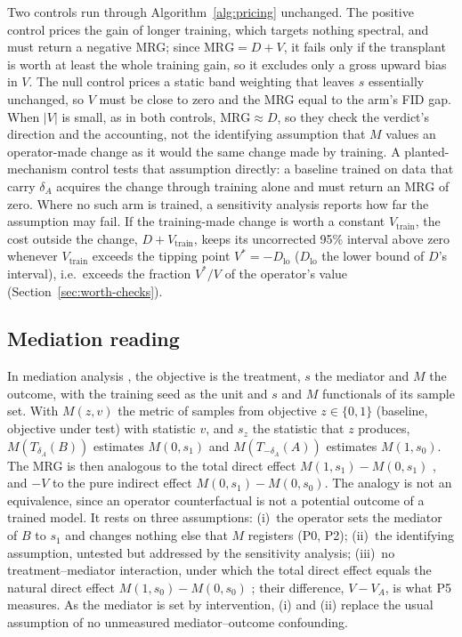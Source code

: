 Two controls run through Algorithm~\ref{alg:pricing} unchanged. The positive
control prices the gain of longer training, which targets nothing spectral,
and must return a negative MRG; since $\mathrm{MRG} = D + V$, it fails only
if the transplant is worth at least the whole training gain, so it excludes
only a gross upward bias in $V$. The null control prices a static band
weighting that leaves $s$ essentially unchanged, so $V$ must be close to zero
and the MRG equal to the arm's FID gap. When $|V|$ is small, as in both
controls, $\mathrm{MRG} \approx D$, so they check the verdict's direction and
the accounting, not the identifying assumption that $M$ values an
operator-made change as it would the same change made by training. A
planted-mechanism control tests that assumption directly: a baseline trained
on data that carry $\delta_A$ acquires the change through training alone and
must return an MRG of zero. Where no such arm is trained, a sensitivity
analysis reports how far the assumption may fail. If the training-made change is worth a constant
$V_{\mathrm{train}}$, the cost outside the change, $D + V_{\mathrm{train}}$,
keeps its uncorrected 95\% interval above zero whenever $V_{\mathrm{train}}$ exceeds the
tipping point $V^\ast = -D_{\mathrm{lo}}$ ($D_{\mathrm{lo}}$ the lower bound
of $D$'s interval), i.e.\ exceeds the fraction $V^\ast / V$ of the
operator's value (Section~\ref{sec:worth-checks}).

\subsection{Mediation reading}
\label{sec:pricing-reading}

In mediation analysis \citep{robins1992identifiability,pearl2001direct}, the
objective is the treatment, $s$ the mediator and $M$ the outcome, with the
training seed as the unit and $s$ and $M$ functionals of its sample set. With
$M(z, v)$ the metric of samples from objective $z \in \{0, 1\}$ (baseline,
objective under test) with statistic $v$, and $s_z$ the statistic that $z$
produces, $M(T_{\delta_A}(B))$ estimates $M(0, s_1)$ and
$M(T_{-\delta_A}(A))$ estimates $M(1, s_0)$. The MRG is then analogous to the
total direct effect $M(1, s_1) - M(0, s_1)$
\citep{robins1992identifiability}, and $-V$ to the pure indirect effect
$M(0, s_1) - M(0, s_0)$. The analogy is not an equivalence, since an operator
counterfactual is not a potential outcome of a trained model. It rests on
three assumptions: (i)~the operator sets the mediator of $B$ to $s_1$ and
changes nothing else that $M$ registers (P0, P2); (ii)~the identifying
assumption, untested but addressed by the sensitivity analysis; (iii)~no
treatment--mediator interaction, under which the total direct effect equals
the natural direct effect $M(1, s_0) - M(0, s_0)$ \citep{pearl2001direct};
their difference, $V - V_A$, is what P5 measures. As the mediator is set by
intervention, (i) and (ii) replace the usual assumption of no unmeasured
mediator--outcome confounding.
